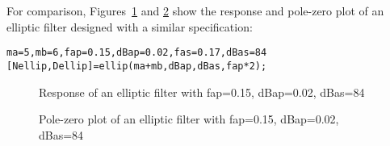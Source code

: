 \documentclass[a4paper,twoside,10pt,english]{report}
\begin{document}
For comparison, Figures~\ref{fig:Parallel-2nd-order-allpass-elliptic-filter} and
\ref{fig:Parallel-2nd-order-allpass-elliptic-filter-pz} show the response and
pole-zero plot of an elliptic filter designed with a similar specification:
\begin{small}
\begin{verbatim}
ma=5,mb=6,fap=0.15,dBap=0.02,fas=0.17,dBas=84
[Nellip,Dellip]=ellip(ma+mb,dBap,dBas,fap*2);
\end{verbatim}
\end{small}
\begin{figure}[!htbp]
\begin{center}
\scalebox{0.7}{}
\caption{Response of an elliptic filter with fap=0.15, dBap=0.02, dBas=84}
\label{fig:Parallel-2nd-order-allpass-elliptic-filter}
\end{center}
\end{figure}
\begin{figure}[!htbp]
\begin{center}
\scalebox{0.7}{}
\caption{Pole-zero plot of an elliptic filter with fap=0.15, dBap=0.02, dBas=84}
\label{fig:Parallel-2nd-order-allpass-elliptic-filter-pz}
\end{center}
\end{figure}
\clearpage
\end{document}
